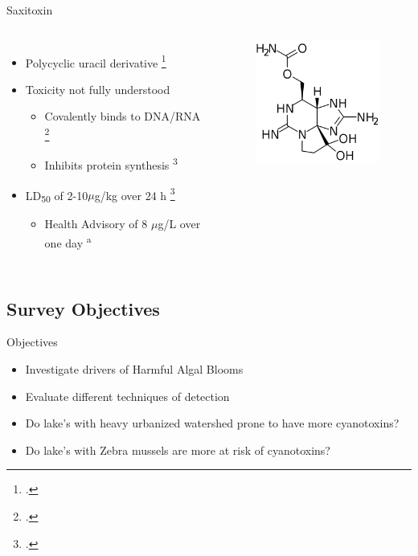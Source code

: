 \begin{frame}{Saxitoxin}
\begin{columns}
	\begin{itemize}
		\item Polycyclic uracil derivative \footcite{moreira_cylindrospermopsin:_2013} 
		\item Toxicity not fully understood 
			\begin{itemize}
				\item Covalently binds to DNA/RNA \footcite{kittler_1._2014} 
				\item Inhibits protein synthesis \textsuperscript{3} 
			\end{itemize}
		\item LD\textsubscript{50} of 2-10$\mu$g/kg over 24 h \footcite{shaw_cylindrospermopsin_2000}
			\begin{itemize}
				\item Health Advisory of 8 $\mu$g/L over one day \textsuperscript{a} 
			\end{itemize}
	\end{itemize}
	\begin{figure}
		\hspace*{-10cm}
		\centering
		\includegraphics[width=2in]{saxitoxin.png}
	\end{figure}
\end{columns}

\end{frame}
\subsection{Survey Objectives}
\begin{frame}{Objectives}
	\begin{itemize}
		\item Investigate drivers of Harmful Algal Blooms 
		\item Evaluate different techniques of detection 
		\item Do lake's with heavy urbanized watershed prone to have more cyanotoxins? 
		\item Do lake's with Zebra mussels are more at risk of cyanotoxins?
	\end{itemize}
\end{frame}
